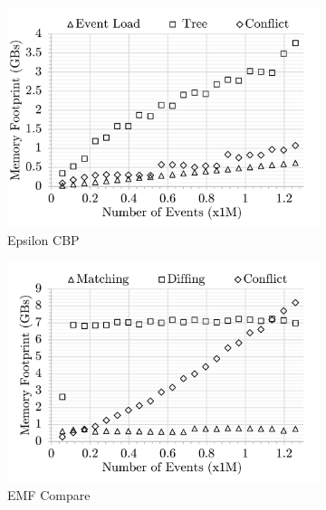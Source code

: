 \begin{figure}[ht]
    \centering
    \begin{subfigure}[t]{0.32\linewidth}
        \includegraphics[width=\linewidth]{ecbp-conflict-memory-events}
        \caption{Epsilon CBP}
        \label{fig:ecbp-conflict-memory-events}
    \end{subfigure}
    \hfill
    \begin{subfigure}[t]{0.32\linewidth}
        \includegraphics[width=\linewidth]{emfc-conflict-memory-events}
        \caption{EMF Compare}
        \label{fig:emfc-conflict-memory-events}
    \end{subfigure}
    \hfill
    \begin{subfigure}[t]{0.32\linewidth}

\end{subfigure}
\end{figure}

